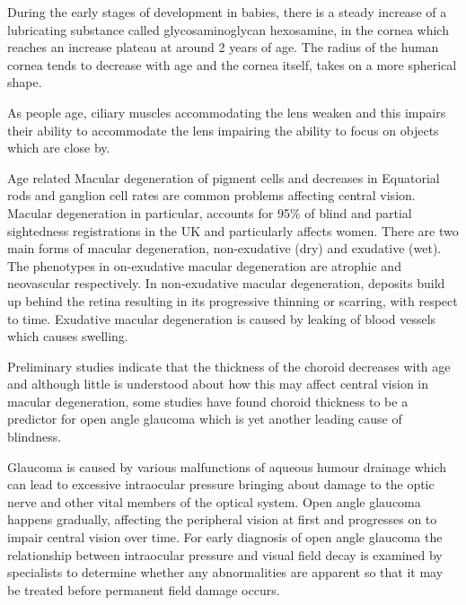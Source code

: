 During the early stages of development in babies, there is a steady
increase of a lubricating substance called glycosaminoglycan hexosamine,
in the cornea which reaches an increase plateau at around 2 years of age.
\cite{praus1975glycosaminoglycans} The radius of the human cornea tends
to decrease with age and the cornea itself, takes on a more spherical
shape.\cite{guirao2000optical}

As people age, ciliary muscles accommodating the lens weaken and
this impairs their ability to accommodate the lens impairing
the ability to focus on objects which are close by.
\cite{fisher1985ciliary}

Age related Macular degeneration of pigment cells and decreases in
Equatorial rods and ganglion cell rates are common problems affecting
central vision.\cite{gao1992aging} Macular degeneration in particular,
accounts for 95\% of blind and partial sightedness registrations in the
UK and particularly affects women.\cite{o1998age,klein2005complement}
There are two main forms of macular degeneration, non-exudative (dry)
and exudative (wet). The phenotypes in on-exudative macular degeneration
are atrophic and neovascular respectively.\cite{kuno2011dry} In
non-exudative macular degeneration, deposits build up behind the retina
resulting in its progressive thinning or scarring, with respect to time.
Exudative macular degeneration is caused by leaking of blood vessels
which causes swelling.

Preliminary studies indicate that the thickness of the choroid decreases
with age and although little is understood about how this may affect
central vision in macular degeneration, some studies have found
choroid thickness to be a predictor for open angle glaucoma which
is yet another leading cause of blindness.
\cite{margolis2009pilot,gordon2002ocular}

Glaucoma is caused by various malfunctions of aqueous humour drainage
which can lead to excessive intraocular pressure bringing about damage
to the optic nerve and other vital members of the optical system.
\cite{distelhorst2003open} Open angle glaucoma happens gradually,
affecting the peripheral vision at first and progresses on to impair
central vision over time. For early diagnosis of open angle glaucoma
the relationship between intraocular pressure and visual field decay
is examined by specialists to determine whether any abnormalities are
apparent so that it may be treated before permanent field damage occurs.
\cite{goldmann1972open}

